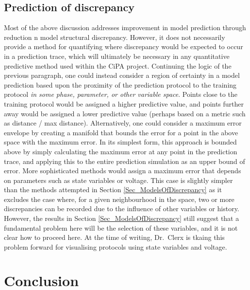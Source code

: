\documentclass[11pt,a4paper,oneside]{article}
\begin{document}
\subsection{Prediction of discrepancy}

Most of the above discussion addresses improvement in model prediction through reduction n model structural discrepancy. However, it does not necessarily provide a method for quantifying where discrepancy would be expected to occur in a prediction trace, which will ultimately be necessary in any quantitative predictive method used within the CiPA project. Continuing the logic of the previous paragraph, one could instead consider a region of certainty in a model prediction based upon the proximity of the prediction protocol to the training protocol \textit{in some phase, parameter, or other variable space}. Points close to the training protocol would be assigned a higher predictive value, and points further away would be assigned a lower predictive value (perhaps based on a metric such as distance / max distance). Alternatively, one could consider a maximum error envelope by creating a manifold that bounds the error for a point in the above space with the maximum error. In its simplest form, this approach is bounded above by simply calculating the maximum error at any point in the prediction trace, and applying this to the entire prediction simulation as an upper bound of error. More sophisticated methods would assign a maximum error that depends on parameters such as state variables or voltage. This case is slightly simpler than the methods attempted in Section \ref{Sec_ModelsOfDiscrepancy} as it excludes the case where, for a given neighbourhood in the space, two or more discrepancies can be recorded due to the influence of other variables or history. However, the results in Section \ref{Sec_ModelsOfDiscrepancy} still suggest that a fundamental problem here will be the selection of these variables, and it is not clear how to proceed here. At the time of writing, Dr.~Clerx is tkaing this problem forward for visualising protocols using state variables and voltage.

\section{Conclusion}
\end{document}
